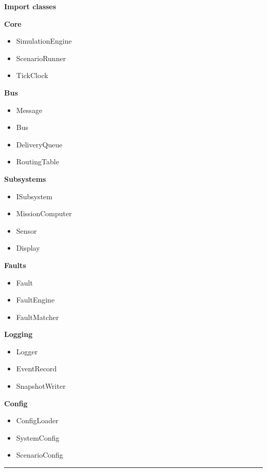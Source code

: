 \documentclass{report}
\begin{document}
\vspace{\baselineskip}
\textbf{Import classes}

\vspace{\baselineskip}
\textbf{Core}
\begin{itemize}
   \item SimulationEngine
   \item ScenarioRunner
   \item TickClock
\end{itemize}

\textbf{Bus}
\begin{itemize}
   \item Message
   \item Bus
   \item DeliveryQueue
   \item RoutingTable
\end{itemize}

\textbf{Subsystems}
\begin{itemize}
   \item ISubsystem
   \item MissionComputer
   \item Sensor
   \item Display
\end{itemize}

\textbf{Faults}
\begin{itemize}
   \item Fault
   \item FaultEngine
   \item FaultMatcher
\end{itemize}

\textbf{Logging}
\begin{itemize}
   \item Logger
   \item EventRecord
   \item SnapshotWriter
\end{itemize}

\textbf{Config}
\begin{itemize}
   \item ConfigLoader
   \item SystemConfig
   \item ScenarioConfig
\end{itemize}


\begin{center}
\rule{0.9\textwidth}{1pt}
\end{center}
\end{document}
